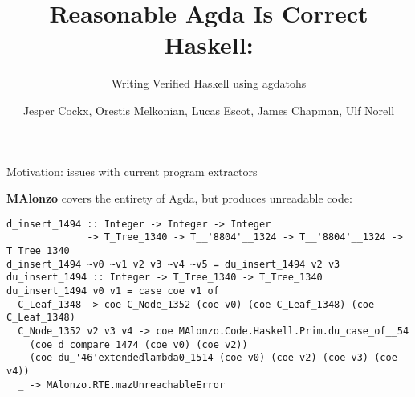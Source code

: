 \documentclass[aspectratio=169]{beamer}
\title{Reasonable Agda Is Correct Haskell:}
\subtitle{Writing Verified Haskell using agdatohs}
\author{Jesper Cockx, \alert{Orestis Melkonian}, Lucas Escot, James Chapman, Ulf Norell}
\date{}
\begin{document}
\begin{center}
\vspace*{-2cm}
\maketitle
\end{center}

\begin{frame}[fragile]{Motivation: issues with current program extractors}

\textbf{MAlonzo} covers the entirety of Agda, but produces unreadable code:
\begin{alertblock}{}
\begin{verbatim}
d_insert_1494 :: Integer -> Integer -> Integer
              -> T_Tree_1340 -> T__'8804'__1324 -> T__'8804'__1324 -> T_Tree_1340
d_insert_1494 ~v0 ~v1 v2 v3 ~v4 ~v5 = du_insert_1494 v2 v3
du_insert_1494 :: Integer -> T_Tree_1340 -> T_Tree_1340
du_insert_1494 v0 v1 = case coe v1 of
  C_Leaf_1348 -> coe C_Node_1352 (coe v0) (coe C_Leaf_1348) (coe C_Leaf_1348)
  C_Node_1352 v2 v3 v4 -> coe MAlonzo.Code.Haskell.Prim.du_case_of__54
    (coe d_compare_1474 (coe v0) (coe v2))
    (coe du_'46'extendedlambda0_1514 (coe v0) (coe v2) (coe v3) (coe v4))
  _ -> MAlonzo.RTE.mazUnreachableError
\end{verbatim}
\end{alertblock}

\end{frame}
\end{document}
